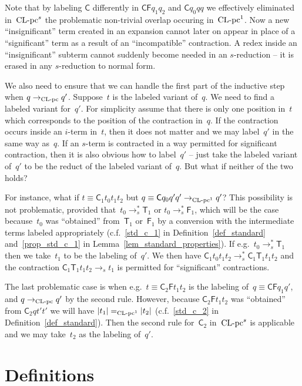 \documentclass[a4paper,UKenglish]{lipics-v2016}
\newcommand{\Cs}{\mathsf{C}}
\newcommand{\Fs}{\mathsf{F}}
\newcommand{\Ts}{\mathsf{T}}
\newcommand{\erase}[1]{\ensuremath{|#1|}}
\newcommand{\CLC}{{\mbox{${\text{\rm CL-pc}^1}$}}}
\newcommand{\sCLC}{{\ensuremath{\text{\rm CL-pc}^1}}}
\newcommand{\sCLCz}{\ensuremath{\text{\rm CL-pc}}}
\newcommand{\CLCs}{{\mbox{${\text{\rm CL-pc}^s}$}}}
\begin{document}
Note that by labeling $\Cs$ differently in $\Cs \Fs q_1 q_2$ and
$\Cs q_0 q q$ we effectively eliminated in~$\CLCs$ the problematic
non-trivial overlap occuring in~$\CLC$. Now a new ``insignificant''
term created in an expansion cannot later on appear in place of a
``significant'' term as a result of an ``incompatible'' contraction. A
redex inside an ``insignificant'' subterm cannot suddenly become
needed in an $s$-reduction -- it is erased in any $s$-reduction to
normal form.

We also need to ensure that we can handle the first part of the
inductive step when $q \to_{\sCLCz} q'$. Suppose~$t$ is the labeled
variant of~$q$. We need to find a labeled variant for~$q'$. For
simplicity assume that there is only one position in~$t$ which
corresponds to the position of the contraction in~$q$. If the
contraction occurs inside an $i$-term in~$t$, then it does not matter
and we may label~$q'$ in the same way as~$q$. If an $s$-term is
contracted in a way permitted for significant contraction, then it is
also obvious how to label~$q'$ -- just take the labeled variant
of~$q'$ to be the reduct of the labeled variant of~$q$. But what if
neither of the two holds?

For instance, what if $t \equiv \Cs_1 t_0 t_1 t_2$ but
$q \equiv \Cs q_0 q' q' \to_\sCLC q'$? This possibility is not
problematic, provided that~$t_0 \to_s^* \Ts_1$ or $t_0 \to_s^* \Fs_1$,
which will be the case because~$t_0$ was ``obtained'' from~$\Ts_1$
or~$\Fs_1$ by a conversion with the intermediate terms labeled
appropriately (c.f.~\ref{std_c_1} in Definition~\ref{def_standard}
and~\ref{prop_std_c_1} in Lemma~\ref{lem_standard_properties}). If
e.g.~$t_0 \to_s^* \Ts_1$ then we take~$t_1$ to be the labeling
of~$q'$. We then have $\Cs_1 t_0 t_1 t_2 \to_s^* \Cs_1 \Ts_1 t_1 t_2$
and the contraction $\Cs_1 \Ts_1 t_1 t_2 \to_s t_1$ is permitted for
``significant'' contractions.

The last problematic case is when e.g.~$t \equiv \Cs_2 \Fs t_1 t_2$ is
the labeling of~$q \equiv \Cs \Fs q_1 q'$, and $q \to_{\sCLCz} q'$ by
the second rule. However, because $\Cs_2 \Fs t_1 t_2$ was ``obtained''
from $\Cs_2 q t' t'$ we will have $\erase{t_1} =_\sCLC \erase{t_2}$
(c.f.~\ref{std_c_2} in Definition~\ref{def_standard}). Then the second
rule for~$\Cs_2$ in~$\CLCs$ is applicable and we may take~$t_2$ as the
labeling of~$q'$.

\section{Definitions}\label{sec_definitions}
\end{document}
